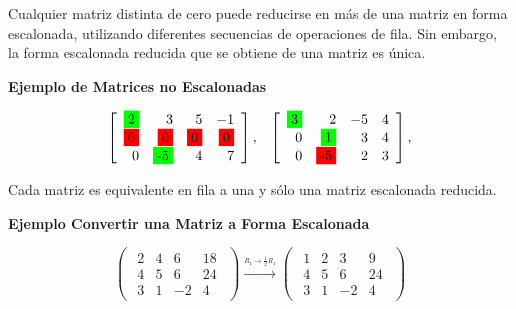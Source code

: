 \documentclass{article}
\begin{document}
Cualquier matriz distinta de cero puede reducirse en más de una matriz en forma escalonada, utilizando diferentes secuencias de operaciones de fila. Sin embargo, la forma escalonada reducida que se obtiene de una matriz es única.

\begin{large}
    \textbf{Ejemplo de Matrices no Escalonadas}
\end{large}

\begin{equation*}
    \begin{array}{lrl}
        {\left[\begin{array}{rrrr}
            \colorbox{green}{2} & 3 & 5 & -1  \\
            \colorbox{red}{0} & \colorbox{red}{0} & \colorbox{red}{0} & \colorbox{red}{0}\\
            0 & \colorbox{green}{-5} & 4 & 7
            \end{array}\right],} 
            & {\left[\begin{array}{rrrr}
            \colorbox{green}{3} & 2 & -5 & 4 \\
            0 & \colorbox{green}{1} & 3 & 4 \\
            0 & \colorbox{red}{-5} & 2 & 3
            \end{array}\right],} 
    \end{array}
\end{equation*}

\begin{tcolorbox}[colback=green!20!white,colframe=green!80!black,title=Unicidad de la Forma Escalonada Reducida]
    Cada matriz es equivalente en fila a una y sólo una matriz escalonada reducida.
\end{tcolorbox}

\begin{large}
    \textbf{Ejemplo Convertir una Matriz a Forma Escalonada}
\end{large}

\begin{equation*}
    \begin{pmatrix}
        \begin{array}{rrr|r}
            2 & 4 & 6 & 18\\
            4 & 5 & 6 & 24\\
            3 & 1 & -2 & 4
        \end{array}
    \end{pmatrix}
    \xrightarrow{\stackrel{R_1 \rightarrow \frac{1}{2}R_1}{}}
    \begin{pmatrix}
        \begin{array}{rrr|r}
            1 & 2 & 3 & 9\\
            4 & 5 & 6 & 24\\
            3 & 1 & -2 & 4
        \end{array}
    \end{pmatrix}
\end{equation*}
\end{document}
